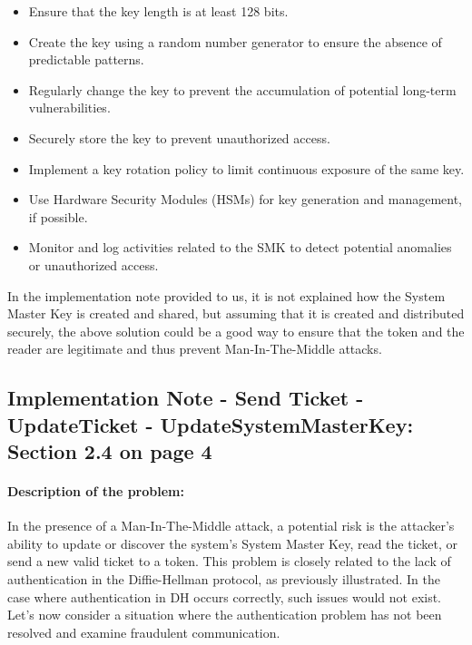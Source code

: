 \documentclass[12pt]{article}
\begin{document}
    \begin{itemize}
        \item Ensure that the key length is at least 128 bits.
        \item Create the key using a random number generator to ensure the absence of predictable patterns.
        \item Regularly change the key to prevent the accumulation of potential long-term vulnerabilities.
        \item Securely store the key to prevent unauthorized access.
        \item Implement a key rotation policy to limit continuous exposure of the same key.
        \item Use Hardware Security Modules (HSMs) for key generation and management, if possible.
        \item Monitor and log activities related to the SMK to detect potential anomalies or unauthorized access.
    \end{itemize}
    In the implementation note provided to us, it is not explained how the System Master Key is created and shared, but assuming that it is created and distributed securely, the above solution could be a good way to ensure that the token and the reader are legitimate and thus prevent Man-In-The-Middle attacks.


\subsection{Implementation Note - Send Ticket - UpdateTicket - UpdateSystemMasterKey: Section 2.4 on page 4}

    \paragraph{Description of the problem:}
    In the presence of a Man-In-The-Middle attack, a potential risk is the attacker's ability to update or discover the system's System Master Key, read the ticket, or send a new valid ticket to a token. This problem is closely related to the lack of authentication in the Diffie-Hellman protocol, as previously illustrated. In the case where authentication in DH occurs correctly, such issues would not exist.
    \\
    Let's now consider a situation where the authentication problem has not been resolved and examine fraudulent communication.
    
\end{document}
